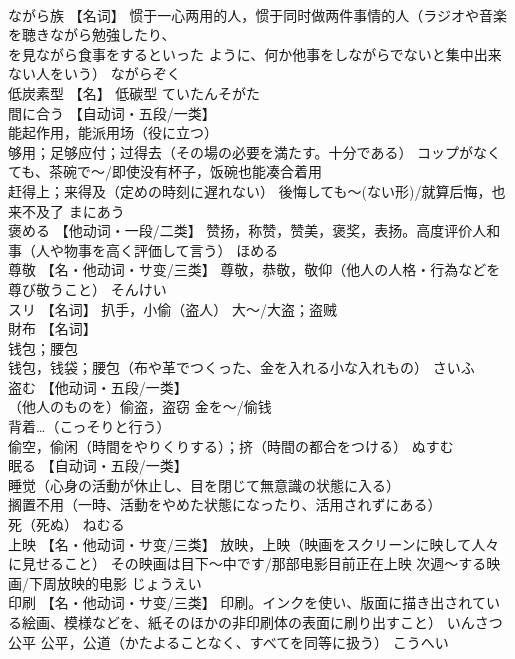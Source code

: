 \documentclass[8pt]{extreport}
\begin{document}
\begin{CJK}{UTF8}{min}
\\	ながら族	【名词】 惯于一心两用的人，惯于同时做两件事情的人（ラジオや音楽を聴きながら勉強したり、
\\	を見ながら食事をするといった ように、何か他事をしながらでないと集中出来ない人をいう）	ながらぞく	
\\	低炭素型	【名】 低碳型	ていたんそがた	
\\	間に合う	【自动词・五段/一类】 
\\	能起作用，能派用场（役に立つ） 
\\	够用；足够应付；过得去（その場の必要を満たす。十分である） コップがなくても、茶碗で〜/即使没有杯子，饭碗也能凑合着用 
\\	赶得上；来得及（定めの時刻に遅れない） 後悔しても〜(ない形)/就算后悔，也来不及了	まにあう	
\\	褒める	【他动词・一段/二类】 赞扬，称赞，赞美，褒奖，表扬。高度评价人和事（人や物事を高く評価して言う）	ほめる	
\\	尊敬	【名・他动词・サ变/三类】 尊敬，恭敬，敬仰（他人の人格・行為などを尊び敬うこと）	そんけい	
\\	スリ	【名词】 扒手，小偷（盗人） 大～/大盗；盗贼		
\\	財布	【名词】 
\\	钱包；腰包 
\\	钱包，钱袋；腰包（布や革でつくった、金を入れる小な入れもの）	さいふ	
\\	盗む	【他动词・五段/一类】 
\\	（他人のものを）偷盗，盗窃 金を〜/偷钱 
\\	背着…（こっそりと行う） 
\\	偷空，偷闲（時間をやりくりする）；挤（時間の都合をつける）	ぬすむ	
\\	眠る	【自动词・五段/一类】 
\\	睡觉（心身の活動が休止し、目を閉じて無意識の状態に入る） 
\\	搁置不用（一時、活動をやめた状態になったり、活用されずにある） 
\\	死（死ぬ）	ねむる	
\\	上映	【名・他动词・サ变/三类】 放映，上映（映画をスクリーンに映して人々に見せること） その映画は目下〜中です/那部电影目前正在上映 次週〜する映画/下周放映的电影	じょうえい	
\\	印刷	【名・他动词・サ变/三类】 印刷。インクを使い、版面に描き出されている絵画、模様などを、紙そのほかの非印刷体の表面に刷り出すこと）	いんさつ	
\\	公平	公平，公道（かたよることなく、すべてを同等に扱う）	こうへい	

\end{CJK}
\end{document}
